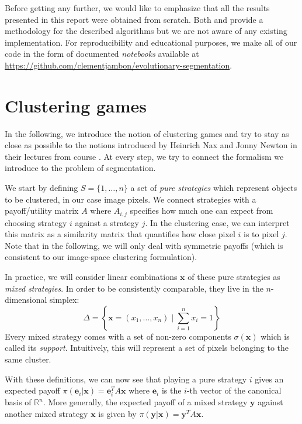 \documentclass[11pt,a4paper]{article}
\begin{document}
Before getting any further, we would like to emphasize that all the results presented in this report were obtained from scratch. Both \cite{bulo-thesis} and \cite{game-clustering} provide a methodology for the described algorithms but we are not aware of any existing implementation. For reproducibility and educational purposes, we make all of our code in the form of documented \textit{notebooks} available at \url{https://github.com/clementjambon/evolutionary-segmentation}. 

\section{Clustering games}
\label{sec:cluster-game}

In the following, we introduce the notion of clustering games and try to stay as close as possible to the notions introduced by Heinrich Nax and Jonny Newton in their lectures from course \cite{course-gt}. At every step, we try to connect the formalism we introduce to the problem of segmentation.

We start by defining $S=\{1, \ldots, n\}$ a set of \textit{pure strategies} which represent objects to be clustered, in our case image pixels. We connect strategies with a payoff/utility matrix $A$ where $A_{i, j}$ specifies how much one can expect from choosing strategy $i$ against a strategy $j$. In the clustering case, we can interpret this matrix as a similarity matrix that quantifies how close pixel $i$ is to pixel $j$. Note that in the following, we will only deal with symmetric payoffs (which is consistent to our image-space clustering formulation). 

In practice, we will consider linear combinations $\mathbf{x}$ of these pure strategies as \textit{mixed strategies}. In order to be consistently comparable, they live in the $n$-dimensional simplex:
\begin{equation}
    \Delta = \left\{\mathbf{x} = (x_1, \ldots, x_n)\; |\; \sum_{i=1}^n x_i = 1\right\}
\end{equation}
Every mixed strategy comes with a set of non-zero components $\sigma(\mathbf{x})$ which is called its \textit{support}. Intuitively, this will represent a set of pixels belonging to the same cluster. 

With these definitions, we can now see that playing a pure strategy $i$ gives an expected payoff $\pi(\mathbf{e}_i|\mathbf{x})=\mathbf{e}_i^TA\mathbf{x}$ where $\mathbf{e}_i$ is the $i$-th vector of the canonical basis of $\mathbb{R}^n$. More generally, the expected payoff of a mixed strategy $\mathbf{y}$ against another mixed strategy $\mathbf{x}$ is given by $\pi(\mathbf{y}|\mathbf{x})=\mathbf{y}^TA\mathbf{x}$.
\end{document}
